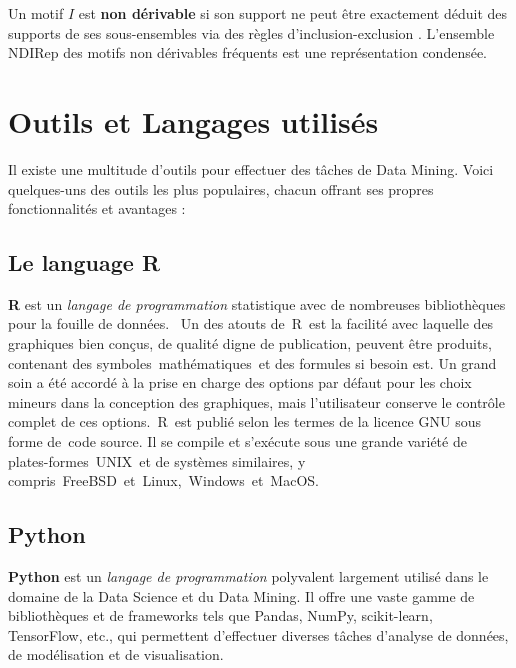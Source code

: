 \documentclass[a4paper,12pt]{article}
\begin{document}
        Un motif \( I \) est \textbf{non dérivable} si son support ne peut être exactement déduit des supports de ses sous-ensembles via des règles d’inclusion-exclusion \cite{CG06}. L’ensemble \( \text{NDIRep} \) des motifs non dérivables fréquents est une représentation condensée.
        
        

        


\section{Outils et Langages utilisés}
Il existe une multitude d’outils pour effectuer des tâches de Data Mining. Voici quelques-uns des outils les plus populaires, chacun offrant ses propres fonctionnalités et avantages :

    \subsection{Le language R}
    \textbf{R} est un \emph{langage de programmation} statistique avec de nombreuses bibliothèques pour la fouille de données.  Un des atouts de R est la facilité avec laquelle des graphiques bien conçus, de qualité digne de publication, peuvent être produits, contenant des symboles mathématiques et des formules si besoin est. Un grand soin a été accordé à la prise en charge des options par défaut pour les choix mineurs dans la conception des graphiques, mais l'utilisateur conserve le contrôle complet de ces options. R est publié selon les termes de la licence GNU sous forme de code source. Il se compile et s'exécute sous une grande variété de plates-formes UNIX et de systèmes similaires, y compris FreeBSD et Linux, Windows et MacOS.
    
    \subsection{Python}
    \textbf{Python} est un \emph{langage de programmation} polyvalent largement utilisé dans le domaine de la Data Science et du Data Mining. Il offre une vaste gamme de bibliothèques et de frameworks tels que Pandas, NumPy, scikit-learn, TensorFlow, etc., qui permettent d’effectuer diverses tâches d’analyse de données, de modélisation et de visualisation.
\end{document}
